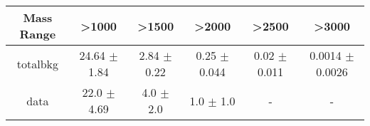 \begin{footnotesize} 
\begin{tabular}{c|c|c|c|c|c} 
Mass Range & >1000 & >1500 & >2000 & >2500 & >3000 \\ 
\hline\hline 
totalbkg & 24.64 $\pm$ 1.84 & 2.84 $\pm$ 0.22 & 0.25 $\pm$ 0.044 & 0.02 $\pm$ 0.011 & 0.0014 $\pm$ 0.0026\\ 
data & 22.0 $\pm$ 4.69 & 4.0 $\pm$ 2.0 & 1.0 $\pm$ 1.0 &  -  &  - \\ 
\hline\hline 
\end{tabular} 
\end{footnotesize} 
\newline 
